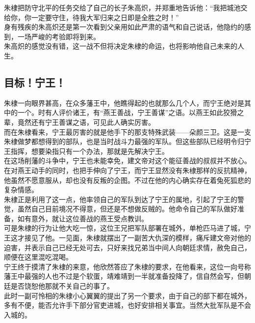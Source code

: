 \begin{multicols}{\theparacolNo}
朱棣把防守北平的任务交给了自己的长子朱高炽，并郑重地告诉他：“我把城池交给你，你一定要守住，待我大军归来之日即是全胜之时！”\\

身有残疾的朱高炽还是第一次看到父亲用如此严肃的语气和自己说话，他隐约的感到，一场严峻的考验即将到来。\\

朱高炽的感觉没有错，这一战不但将决定朱棣的命运，也将影响他自己未来的人生。\\

\subsection{目标！宁王！}
朱棣一向眼界甚高，在众多藩王中，他瞧得起的也就那么几个人，而宁王绝对是其中的一个。时有人评价诸王，有“燕王善战，宁王善谋”之语。以燕王如此狡猾之辈，竟然还有宁王善谋之语，可见此人确实厉害。\\

而在朱棣看来，宁王最厉害的就是他手下的那支特殊武装——朵颜三卫。这是一支朱棣做梦都想得到的部队，也是当时战斗力最强的军队。但这些部队已经明令归宁王指挥，想要染指只有一个办法，那就是先解决宁王。\\

在这场削藩的斗争中，宁王也未能幸免，建文帝对这个能征善战的叔叔并不放心。在对燕王动手的同时，也把手伸向了宁王，而宁王显然没有朱棣那样的反抗精神，他虽然不愿意服从，却也没有反叛的企图。不过在他的内心确实存在着兔死狐悲的复杂情感。\\

朱棣正是利用了这一点，他率领自己的军队到达了宁王的属地，引起了宁王的警觉，虽然自己目前境况不得意，但还是不想做反贼的。他命令自己的军队做好准备，如有意外，就让这位善战的燕王受点教训。\\

可是朱棣的行为让他大吃一惊，这位王兄把军队部署在城外，单枪匹马进了城，宁王这才接见了他。一见面，朱棣就摆出了一副苦大仇深的模样，痛斥建文帝对他的迫害，并表示自己已经无处可去，只好来找兄弟当中间人向朝廷求情，赦免自己，顺便在这里混吃混喝。\\

宁王终于摸清了朱棣的来意，他欣然答应了朱棣的要求，在他看来，这位一向号称藩王中最强的人也不过是个软蛋，靖难靖到一半就准备投降了，信自然会写，但朝廷是否饶恕他那就不关自己的事了。\\

此时一副可怜相的朱棣小心翼翼的提出了另一个要求，由于自己的部下都在城外，多有不便，能否允许手下部分官吏进城，也好安排相关事宜。当然大批军队是不会入城的。\\


\end{multicols}

